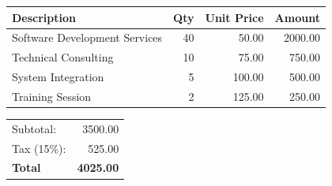 \documentclass[a4paper,11pt]{article}
\begin{document}
\vspace{1cm}



\renewcommand{\arraystretch}{1.5}

\setlength{\tabcolsep}{0pt}

\begin{tabularx}{\linewidth}{|@{}X|r|r|r@{}|}
\hline

\rowcolor{headergray}

\textbf{Description}
&
\textbf{Qty}
&
\textbf{Unit Price}
&
\textbf{Amount}

\\
\hline


Software Development Services
&
40
&
50.00
&
2000.00

\\
\hline


Technical Consulting
&
10
&
75.00
&
750.00

\\
\hline


System Integration
&
5
&
100.00
&
500.00

\\
\hline


Training Session
&
2
&
125.00
&
250.00

\\
\hline

\end{tabularx}


\begin{flushright}

\begin{tabular}{lr}

Subtotal:
&
3500.00
\\

Tax (15\%):
&
525.00
\\

\hline

\textbf{Total}
&
\textbf{4025.00}

\\

\end{tabular}

\end{flushright}
\end{document}
